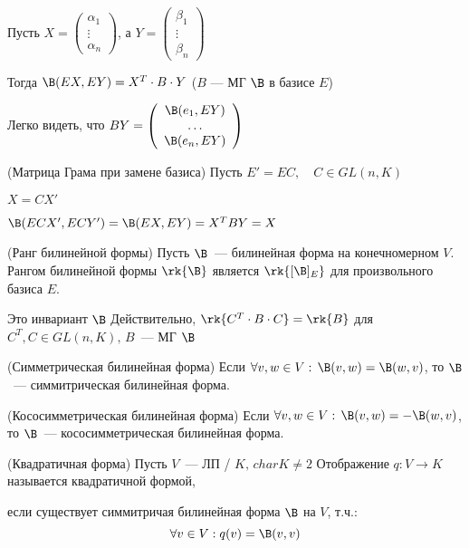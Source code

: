 Пусть $X = \left(\begin{array}{c}
\alpha_1 \\ 
\vdots \\ 
\alpha_n
\end{array}\right)$,
а $Y = \left(\begin{array}{c}
\beta_1 \\ 
\vdots \\ 
\beta_n
\end{array}\right)$

Тогда $\B(EX, EY) = X^T \cdot B \cdot Y$ ($B$ --- МГ $\B$ в базисе $E$)

Легко видеть, что
$BY = \left(\begin{array}{c}
    \B(e_1, EY) \\ 
    \dots \\ 
    \B(e_n, EY)
\end{array}\right)$


\begin{theorem}(Матрица Грама при замене базиса)
    Пусть $E' = EC, \quad C \in GL(n, K)$

    $X = CX'$

    $\B(ECX', ECY')= \B(EX, EY) = X^TBY = X$
\end{theorem}

\begin{conj}(Ранг билинейной формы)
    Пусть $\B$~--- билинейная форма на конечномерном $V$.
    Рангом билинейной формы $\rk{\B}$ является $\rk{[\B]_E}$ для произвольного базиса $E$.
\end{conj}

\notice Это инвариант $\B$
Действительно, $\rk{C^T \cdot B \cdot C} = \rk{B}$ для $C^T, C \in GL(n, K), \, B$~--- МГ $\B$

\begin{conj}(Симметрическая билинейная форма)
    Если $\forall v, w \in V: \, \B(v, w) = \B(w, v)$, то 
    $\B$~--- симмитрическая билинейная форма.
\end{conj}

\begin{conj}(Кососимметрическая билинейная форма)
    Если $\forall v, w \in V: \, \B(v, w) = -\B(w, v)$, то 
    $\B$~--- кососимметрическая билинейная форма.
\end{conj}

\begin{conj}(Квадратичная форма)
    Пусть $V$~--- ЛП / $K, \, char K \neq 2$
    Отображение $q: V \to K$ называется квадратичной формой,
    
    если существует симмитричая билинейная форма $\B$ на $V$, т.ч.:
    $$
        \forall v \in V: q(v) = \B(v, v)
    $$
\end{conj}

